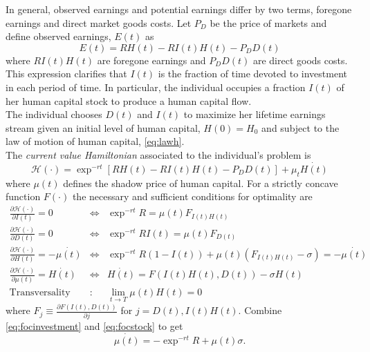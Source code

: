 \indent In general, observed earnings and potential earnings differ by two terms, foregone earnings and direct market goods costs. Let $P_{D}$ be the price of markets and define observed earnings, $E(t)$ as
\begin{equation}
E(t) = R H(t) -  R I(t) H(t) - P_{D} D(t) \label{eq:earnings}
\end{equation}
where $R I(t) H(t)$ are foregone earnings and $ P_{D} D(t) $ are direct goods costs. This expression clarifies that $I(t)$ is the fraction of time devoted to investment in each period of time. In particular, the individual occupies a fraction $I(t)$ of her human capital stock to produce a human capital flow.\\ 
\indent The individual chooses $D(t)$ and $I(t)$ to maximize her lifetime earnings stream given an initial level of human capital, $H(0) = H_{0}$ and subject to the law of motion of human capital, \eqref{eq:lawh}.\\
\indent The \textit{current value Hamiltonian} associated to the individual's problem is
\begin{equation}
\mathcal{H} (\cdot) = \exp^{-rt} \left[ R H(t) -  R I(t) H(t) - P_{D} D(t) \right] + \mu_{t} \dot{H(t)} 
\end{equation}
where $\mu(t)$ defines the shadow price of human capital. For a strictly concave function $F(\cdot)$ the necessary and sufficient conditions for optimality are
\begin{eqnarray}
\frac{\partial \mathcal{H} (\cdot)}{\partial I(t)} = 0 &\Leftrightarrow& \exp^{-rt}R = \mu(t) F_{I(t)H(t)} \label{eq:focinvestment} \\
\frac{\partial \mathcal{H} (\cdot)}{\partial D(t)} = 0 &\Leftrightarrow& \exp^{-rt}R I(t) = \mu(t) F_{D(t)} \label{eq:focgoods} \\
\frac{\partial \mathcal{H} (\cdot)}{\partial H(t)} = - \dot{\mu(t)} &\Leftrightarrow& \exp^{-rt} R \left( 1 - I (t) \right) + \mu(t) \left(  F_{I(t)H(t)} - \sigma \right) = - \dot{\mu(t)} \label{eq:focstock} \\ 
\frac{\partial \mathcal{H} (\cdot)}{\partial \mu(t)} = \dot{H(t)} &\Leftrightarrow& \dot{H(t)} = F \left( I(t) H(t), D(t) \right) - \sigma H(t) \label{eq:focmotion} \\
\text{Transversality} &:& \lim_{t \rightarrow T} \mu(t) H(t) = 0 \label{eq:foctransversality}
\end{eqnarray}
where $F_{j} \equiv \frac{\partial F \left( I(t), D(t) \right) }{\partial j}$ for $j = D(t), I(t) H(t)$. Combine \eqref{eq:focinvestment} and \eqref{eq:focstock} to get 
\begin{equation}
\dot{\mu(t)} = - \exp^{-rt} R + \mu(t) \sigma \label{eq:focinvstockcombine}.
\end{equation}

